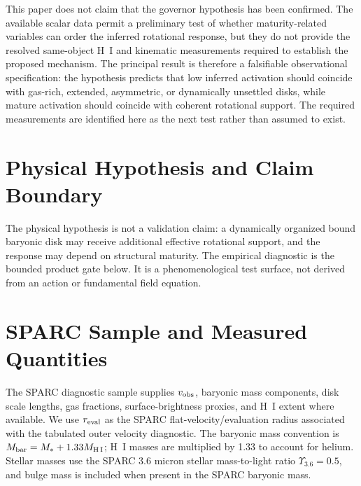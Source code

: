 \documentclass[11pt]{article}
\begin{document}
\begin{center}
\end{center}

This paper does not claim that the governor hypothesis has been confirmed. The available scalar data permit a preliminary test of whether maturity-related variables can order the inferred rotational response, but they do not provide the resolved same-object H~I and kinematic measurements required to establish the proposed mechanism. The principal result is therefore a falsifiable observational specification: the hypothesis predicts that low inferred activation should coincide with gas-rich, extended, asymmetric, or dynamically unsettled disks, while mature activation should coincide with coherent rotational support. The required measurements are identified here as the next test rather than assumed to exist.

\section{Physical Hypothesis and Claim Boundary}

The physical hypothesis is not a validation claim: a dynamically organized bound baryonic disk may receive additional effective rotational support, and the response may depend on structural maturity. The empirical diagnostic is the bounded product gate below. It is a phenomenological test surface, not derived from an action or fundamental field equation.

\section{SPARC Sample and Measured Quantities}

The SPARC diagnostic sample supplies $v_{\rm obs}$, baryonic mass components, disk scale lengths, gas fractions, surface-brightness proxies, and H~I extent where available. We use $r_{\rm eval}$ as the SPARC flat-velocity/evaluation radius associated with the tabulated outer velocity diagnostic. The baryonic mass convention is $M_{\rm bar}=M_*+1.33M_{\rm H\,I}$; H~I masses are multiplied by 1.33 to account for helium. Stellar masses use the SPARC 3.6 micron stellar mass-to-light ratio $\Upsilon_{3.6}=0.5$, and bulge mass is included when present in the SPARC baryonic mass.
\end{document}
